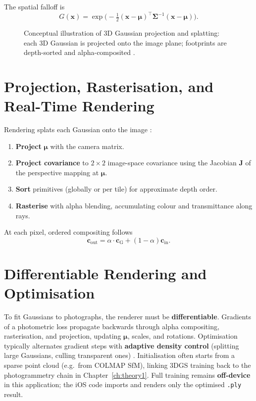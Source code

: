 The spatial falloff is
\[
G(\mathbf{x}) = \exp\bigl(-\tfrac{1}{2}(\mathbf{x}-\boldsymbol{\mu})^\top \boldsymbol{\Sigma}^{-1} (\mathbf{x}-\boldsymbol{\mu})\bigr).
\]

\begin{figure}[H]
\centering
{}
\caption{Conceptual illustration of 3D Gaussian projection and splatting: each 3D Gaussian is projected onto the image plane; footprints are depth-sorted and alpha-composited \cite{kerbl20233dgs}.}
\label{fig:gaussian_project}
\end{figure}

\section{Projection, Rasterisation, and Real-Time Rendering}
\label{sec:3dgs_splatting}

Rendering splats each Gaussian onto the image \cite{kerbl20233dgs}:

\begin{enumerate}
    \item \textbf{Project} $\boldsymbol{\mu}$ with the camera matrix.
    \item \textbf{Project covariance} to $2\times2$ image-space covariance using the Jacobian $\mathbf{J}$ of the perspective mapping at $\boldsymbol{\mu}$.
    \item \textbf{Sort} primitives (globally or per tile) for approximate depth order.
    \item \textbf{Rasterise} with alpha blending, accumulating colour and transmittance along rays.
\end{enumerate}

At each pixel, ordered compositing follows
\[
\mathbf{c}_{\mathrm{out}} = \alpha \cdot \mathbf{c}_{\mathrm{G}} + (1-\alpha) \mathbf{c}_{\mathrm{in}}.
\]

\section{Differentiable Rendering and Optimisation}
\label{sec:3dgs_differentiable}

To fit Gaussians to photographs, the renderer must be \textbf{differentiable}. Gradients of a photometric loss propagate backwards through alpha compositing, rasterisation, and projection, updating $\boldsymbol{\mu}$, scales, and rotations. Optimisation typically alternates gradient steps with \textbf{adaptive density control} (splitting large Gaussians, culling transparent ones) \cite{kerbl20233dgs}. Initialisation often starts from a sparse point cloud (e.g.\ from COLMAP SfM), linking 3DGS training back to the photogrammetry chain in Chapter~\ref{ch:theory1}. Full training remains \textbf{off-device} in this application; the iOS code imports and renders only the optimised \texttt{.ply} result.

